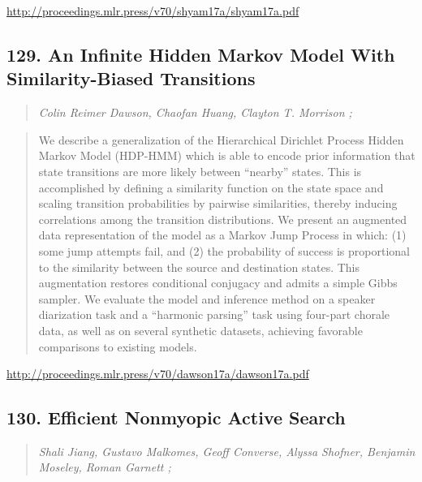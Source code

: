 \documentclass{article}
\begin{document}
\href{http://proceedings.mlr.press/v70/shyam17a/shyam17a.pdf}{http://proceedings.mlr.press/v70/shyam17a/shyam17a.pdf}

\subsection{129. An Infinite Hidden Markov Model With Similarity-Biased Transitions}

\begin{quote}
\footnotesize{\textit{Colin Reimer Dawson, Chaofan Huang, Clayton T. Morrison ;}}
\end{quote}

\begin{quote}
    We describe a generalization of the Hierarchical Dirichlet Process Hidden Markov Model (HDP-HMM) which is able to encode prior information that state transitions are more likely between “nearby” states. This is accomplished by defining a similarity function on the state space and scaling transition probabilities by pairwise similarities, thereby inducing correlations among the transition distributions. We present an augmented data representation of the model as a Markov Jump Process in which: (1) some jump attempts fail, and (2) the probability of success is proportional to the similarity between the source and destination states. This augmentation restores conditional conjugacy and admits a simple Gibbs sampler. We evaluate the model and inference method on a speaker diarization task and a “harmonic parsing” task using four-part chorale data, as well as on several synthetic datasets, achieving favorable comparisons to existing models.  \end{quote}

\href{http://proceedings.mlr.press/v70/dawson17a/dawson17a.pdf}{http://proceedings.mlr.press/v70/dawson17a/dawson17a.pdf}

\subsection{130. Efficient Nonmyopic Active Search}

\begin{quote}
\footnotesize{\textit{Shali Jiang, Gustavo Malkomes, Geoff Converse, Alyssa Shofner, Benjamin Moseley, Roman Garnett ;}}
\end{quote}
\end{document}
